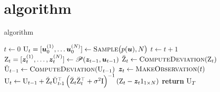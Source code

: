 \section{\meth{} algorithm}
\label{app:algorithm}
\renewcommand{\algorithmicrequire}{\textbf{Input:}}
\renewcommand{\algorithmicensure}{\textbf{Output:}}
\begin{algorithm}
    \caption{\meth{} algorithm}
    \label{alg:meth}
    \begin{algorithmic}[1] %
        \Procedure{\meth{} }{}
          \State $t \gets 0$
          \State $\mathrm{U}_t = [\boldsymbol{u}_0^{(1)}, \ldots \boldsymbol{u}_0^{(N)}]\gets \text{\sc{Sample}}\big(p(\boldsymbol{u}), N\big)$
                \State $t \gets t + 1$
                \State $\mathrm{Z}_t = [\boldsymbol{z}_t^{(1)}, \ldots, \boldsymbol{z}_t^{(N)}] \gets \mathscr{P}(\boldsymbol{z}_{t-1}, \boldsymbol{u}_{t-1})$ 
                \State $\breve{\mathrm{Z}}_t \gets \text{\sc{ComputeDeviation}}(\mathrm{Z}_t)$ 
                \State $\breve{\mathrm{U}}_{t-1} \gets \text{\sc{ComputeDeviation}}(\mathrm{U}_{t-1})$ 
                \State $\boldsymbol{z}_t \gets \text{\sc{MakeObservation}}(t)$ 
                \State $\mathrm{U}_t \gets \mathrm{U}_{t-1} + \breve{\mathrm{Z}}_{t}\breve{\mathrm{U}}_{t{\operatorname{-}}1}^{\top}
    \left(\breve{\mathrm{Z}}_{t}\breve{\mathrm{Z}}_{t}^{\top}+\sigma^2\mathrm{I}\right)^{-1}
    \left(
        \mathrm{Z}_t-\boldsymbol{z}_{t} 1_{1 \times N}
    \right)$ 
            \EndWhile\label{euclidendwhile}
            \State \textbf{return} \(\mathrm{U}_T\)
             
        \EndProcedure
    \end{algorithmic}
\end{algorithm}
